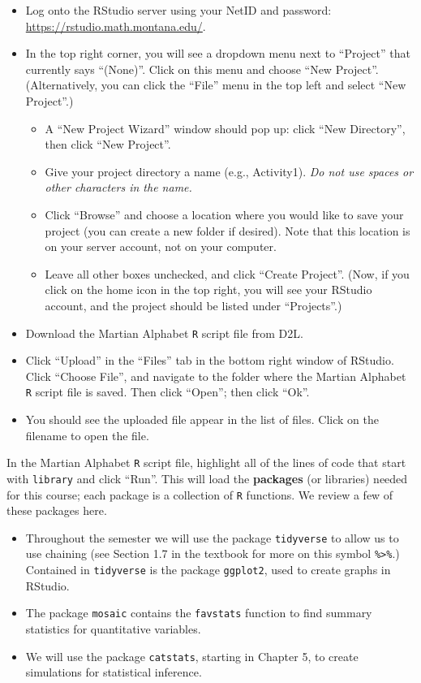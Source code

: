 \documentclass[
]{report}
\providecommand{\tightlist}{%
  \setlength{\itemsep}{0pt}\setlength{\parskip}{0pt}}
\begin{document}
\begin{itemize}
\tightlist
\item
  Log onto the RStudio server using your NetID and password: \url{https://rstudio.math.montana.edu/}.
\item
  In the top right corner, you will see a dropdown menu next to ``Project'' that currently says ``(None)''. Click on this menu and choose ``New Project''. (Alternatively, you can click the ``File'' menu in the top left and select ``New Project''.)

  \begin{itemize}
  \tightlist
  \item
    A ``New Project Wizard'' window should pop up: click ``New Directory'', then click ``New Project''.
  \item
    Give your project directory a name (e.g., Activity1). \emph{Do not use spaces or other characters in the name.}
  \item
    Click ``Browse'' and choose a location where you would like to save your project (you can create a new folder if desired). Note that this location is on your server account, not on your computer.
  \item
    Leave all other boxes unchecked, and click ``Create Project''. (Now, if you click on the home icon in the top right, you will see your RStudio account, and the project should be listed under ``Projects''.)
  \end{itemize}
\item
  Download the Martian Alphabet \texttt{R} script file from D2L.
\item
  Click ``Upload'' in the ``Files'' tab in the bottom right window of RStudio. Click ``Choose File'', and navigate to the folder where the Martian Alphabet \texttt{R} script file is saved. Then click ``Open''; then click ``Ok''.
\item
  You should see the uploaded file appear in the list of files. Click on the filename to open the file.
\end{itemize}

In the Martian Alphabet \texttt{R} script file, highlight all of the lines of code that start with \texttt{library} and click ``Run''. This will load the \textbf{packages} (or libraries) needed for this course; each package is a collection of \texttt{R} functions. We review a few of these packages here.

\begin{itemize}
\tightlist
\item
  Throughout the semester we will use the package \texttt{tidyverse} to allow us to use chaining (see Section 1.7 in the textbook for more on this symbol \texttt{\%\textgreater{}\%}.) Contained in \texttt{tidyverse} is the package \texttt{ggplot2}, used to create graphs in RStudio.
\item
  The package \texttt{mosaic} contains the \texttt{favstats} function to find summary statistics for quantitative variables.
\item
  We will use the package \texttt{catstats}, starting in Chapter 5, to create simulations for statistical inference.
\end{itemize}
\end{document}
